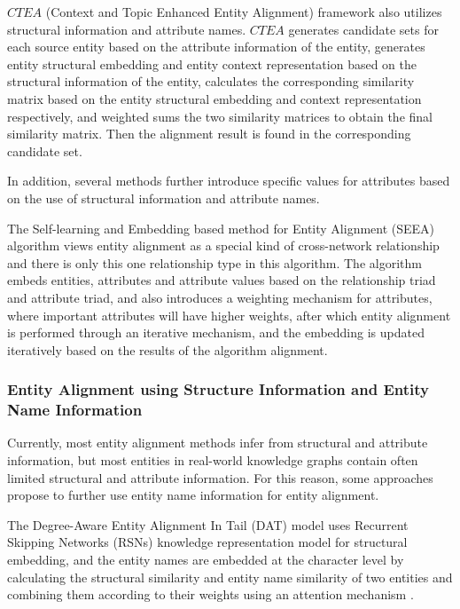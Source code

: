 \documentclass[sigconf]{acmart}
\begin{document}
{$CTEA$ (Context and Topic Enhanced Entity Alignment) framework also utilizes structural information and attribute names. $CTEA$ generates candidate sets for each source entity based on the attribute information of the entity, generates entity structural embedding and entity context representation based on the structural information of the entity, calculates the corresponding similarity matrix based on the entity structural embedding and context representation respectively, and weighted sums the two similarity matrices to obtain the final similarity matrix. Then the alignment result is found in the corresponding candidate set.

In addition, several methods further introduce specific values for attributes based on the use of structural information and attribute names.

The Self-learning and Embedding based method for Entity Alignment (SEEA) \cite{guan2019self} algorithm views entity alignment as a special kind of cross-network relationship and there is only this one relationship type in this algorithm. The algorithm embeds entities, attributes and attribute values based on the relationship triad and attribute triad, and also introduces a weighting mechanism for attributes, where important attributes will have higher weights, after which entity alignment is performed through an iterative mechanism, and the embedding is updated iteratively based on the results of the algorithm alignment.

\subsubsection{Entity Alignment using Structure Information and Entity Name Information}

Currently, most entity alignment methods infer from structural and attribute information, but most entities in real-world knowledge graphs contain often limited structural and attribute information. For this reason, some approaches propose to further use entity name information for entity alignment.

The Degree-Aware Entity Alignment In Tail (DAT) \cite{zeng2020degree} model uses Recurrent Skipping Networks (RSNs) \cite{guo2019learning} knowledge representation model for structural embedding, and the entity names are embedded at the character level by calculating the structural similarity and entity name similarity of two entities and combining them according to their weights using an attention mechanism .

}
\end{document}
